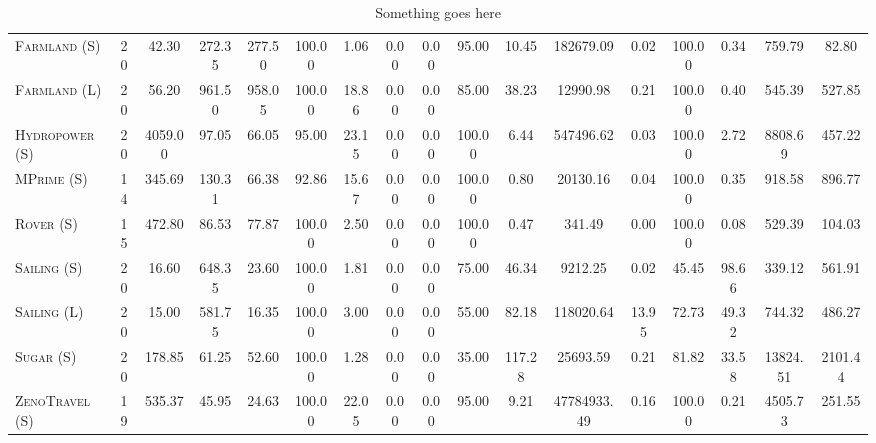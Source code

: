 \documentclass[11pt, landscape]{article}
\begin{document}
\begin{table*}[tb]
{\begin{tabular}{|l|cccc|cccc|cccc|cccc|}
\textsc{Farmland} (S)&20&42.30&272.35&277.50&100.00&1.06&0.00&0.00&95.00&10.45&182679.09&0.02&100.00&0.34&759.79&82.80\\
\textsc{Farmland} (L)&20&56.20&961.50&958.05&100.00&18.86&0.00&0.00&85.00&38.23&12990.98&0.21&100.00&0.40&545.39&527.85\\
\textsc{Hydropower} (S)&20&4059.00&97.05&66.05&95.00&23.15&0.00&0.00&100.00&6.44&547496.62&0.03&100.00&2.72&8808.69&457.22\\
\textsc{MPrime} (S)&14&345.69&130.31&66.38&92.86&15.67&0.00&0.00&100.00&0.80&20130.16&0.04&100.00&0.35&918.58&896.77\\
\textsc{Rover} (S)&15&472.80&86.53&77.87&100.00&2.50&0.00&0.00&100.00&0.47&341.49&0.00&100.00&0.08&529.39&104.03\\
\textsc{Sailing} (S)&20&16.60&648.35&23.60&100.00&1.81&0.00&0.00&75.00&46.34&9212.25&0.02&45.45&98.66&339.12&561.91\\
\textsc{Sailing} (L)&20&15.00&581.75&16.35&100.00&3.00&0.00&0.00&55.00&82.18&118020.64&13.95&72.73&49.32&744.32&486.27\\
\textsc{Sugar} (S)&20&178.85&61.25&52.60&100.00&1.28&0.00&0.00&35.00&117.28&25693.59&0.21&81.82&33.58&13824.51&2101.44\\
\textsc{ZenoTravel} (S)&19&535.37&45.95&24.63&100.00&22.05&0.00&0.00&95.00&9.21&47784933.49&0.16&100.00&0.21&4505.73&251.55\\
\hline

        \end{tabular}} \caption{Something goes here}
        \label{tab:single-static}
        \end{table*}
        
\end{document}
